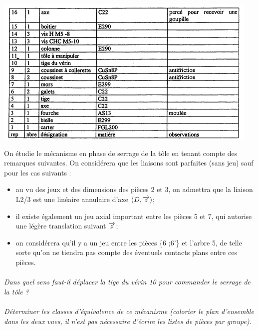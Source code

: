 \documentclass[11pt,oneside]{article}
\begin{document}
\begin{minipage}[c]{.5\linewidth}
\begin{center}
\includegraphics[width=.95\textwidth]{png/img1}
\end{center}
\end{minipage}\hfill
\begin{minipage}[c]{.5\linewidth}
On étudie le mécanisme en phase de serrage de la tôle en tenant compte des remarques suivantes.
On considérera que les liaisons sont parfaites (sans jeu) sauf pour les cas suivants :
\begin{itemize}
\item au vu des jeux et des dimensions des pièces 2 et 3, on admettra que la liaison L2/3 est une linéaire annulaire d’axe $(D, \overrightarrow{z})$;
\item il existe également un jeu axial important entre les pièces 5 et 7, qui autorise une légère translation suivant $\overrightarrow{z}$;
\item on considérera qu’il y a un jeu entre les pièces \{6 ;6’\} et l’arbre 5, de telle sorte qu’on ne tiendra pas compte des éventuels contacts plans entre ces pièces.
\end{itemize}
\end{minipage}

\paragraph{}
\textit{Dans quel sens faut-il déplacer la tige du vérin 10 pour commander le serrage de la tôle ?}

\paragraph{}
\textit{Déterminer les classes d’équivalence de ce mécanisme (colorier le plan d’ensemble dans les deux vues, il n’est pas nécessaire d’écrire les listes de pièces par groupe).}
\end{document}
